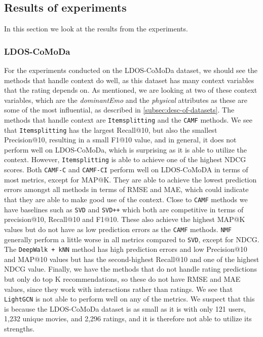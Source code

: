 \subsection{Results of experiments}\label{subsec:resultsofexperiment}
In this section we look at the results from the experiments.
\subsubsection{LDOS-CoMoDa}
For the experiments conducted on the LDOS-CoMoDa dataset, we should see the methods that handle context do well, as this dataset has many context variables that the rating depends on.
As mentioned, we are looking at two of these context variables, which are the \textit{dominantEmo} and the \textit{physical} attributes as these are some of the most influential, as described in \autoref{subsec:desc-of-datasets}.
The methods that handle context are \texttt{Itemsplitting} and the \texttt{CAMF} methods.
We see that \texttt{Itemsplitting} has the largest Recall@10, but also the smallest Precision@10, resulting in a small F1@10 value, and in general, it does not perform well on LDOS-CoMoDa, which is surprising as it is able to utilize the context.
However, \texttt{Itemsplitting} is able to achieve one of the highest NDCG scores.
Both \texttt{CAMF-C} and \texttt{CAMF-CI} perform well on LDOS-CoMoDA in terms of most metrics, except for MAP@K.
They are able to achieve the lowest prediction errors amongst all methods in terms of RMSE and MAE, which could indicate that they are able to make good use of the context.
Close to \texttt{CAMF} methods we have baselines such as \texttt{SVD} and \texttt{SVD++} which both are competitive in terms of precision@10, Recall@10 and F1@10. 
These also achieve the highest MAP@K values but do not have as low prediction errors as the \texttt{CAMF} methods.
\texttt{NMF} generally perform a little worse in all metrics compared to \texttt{SVD}, except for NDCG.
The \texttt{DeepWalk + kNN} method has high prediction errors and low Precision@10 and MAP@10 values but has the second-highest Recall@10 and one of the highest NDCG value.
Finally, we have the methods that do not handle rating predictions but only do top K recommendations, so these do not have RMSE and MAE values, since they work with interactions rather than ratings.
We see that \texttt{LightGCN} is not able to perform well on any of the metrics.
We suspect that this is because the LDOS-CoMoDa dataset is as small as it is with only 121 users, 1,232 unique movies, and 2,296 ratings, and it is therefore not able to utilize its strengths.
